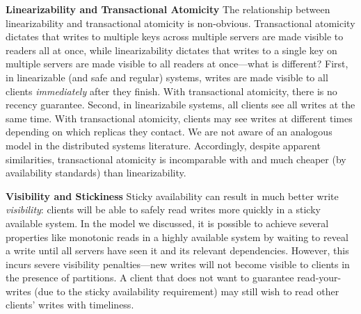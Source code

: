 \vspace{.5em}\noindent\textbf{Linearizability and Transactional
  Atomicity} The relationship between linearizability and
transactional atomicity is non-obvious. Transactional atomicity
dictates that writes to multiple keys across multiple servers are made
visible to readers all at once, while linearizability dictates that
writes to a single key on multiple servers are made visible to all
readers at once---what is different? First, in linearizable (and safe
and regular) systems, writes are made visible to all clients
\textit{immediately} after they finish. With transactional atomicity,
there is no recency guarantee. Second, in linearizabile systems, all
clients see all writes at the same time. With transactional atomicity,
clients may see writes at different times depending on which replicas
they contact. We are not aware of an analogous model in the
distributed systems literature. Accordingly, despite apparent
similarities, transactional atomicity is incomparable with and much
cheaper (by availability standards) than linearizability.

\vspace{.5em}\noindent\textbf{Visibility and Stickiness} Sticky
availability can result in much better write \textit{visibility}:
clients will be able to safely read writes more quickly in a sticky
available system. In the model we discussed, it is possible to achieve
several properties like monotonic reads in a highly available system
by waiting to reveal a write until all servers have seen it and its
relevant dependencies. However, this incurs severe visibility
penalties---new writes will not become visible to clients in the
presence of partitions. A client that does not want to guarantee
read-your-writes (due to the sticky availability requirement) may
still wish to read other clients' writes with timeliness.
